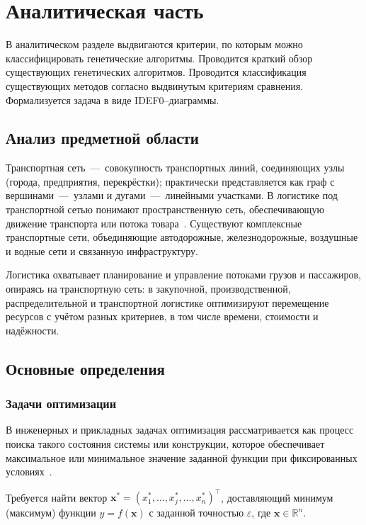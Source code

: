 \chapter{Аналитическая часть}

В аналитическом разделе выдвигаются критерии, по которым можно классифицировать генетические алгоритмы. Проводится краткий обзор существующих генетических алгоритмов. Проводится классификация существующих методов
согласно выдвинутым критериям сравнения. Формализуется задача
в виде IDEF0–диаграммы.

\section{Анализ предметной области}

Транспортная сеть~---~совокупность транспортных линий, соединяющих узлы (города, предприятия, перекрёстки); практически представляется как граф с вершинами~---~узлами и дугами~---~линейными участками. В логистике под транспортной сетью понимают пространственную сеть, обеспечивающую движение транспорта или потока товара~\cite{shaitura2017distributed}. Существуют комплексные транспортные сети, объединяющие автодорожные, железнодорожные, воздушные и водные сети и связанную инфраструктуру.

Логистика охватывает планирование и управление потоками грузов и пассажиров, опираясь на транспортную сеть: в закупочной, производственной, распределительной и транспортной логистике оптимизируют перемещение ресурсов с учётом разных критериев, в том числе времени, стоимости и надёжности. 

\section{Основные определения}

\subsection{Задачи оптимизации}

В инженерных и прикладных задачах оптимизация рассматривается как процесс поиска такого состояния системы или конструкции, которое обеспечивает максимальное или минимальное значение заданной функции при фиксированных условиях~\cite{vereshchaga2023design}. 

Требуется найти вектор $\mathbf{x}^* = (x_1^*,\dots,x_j^*,\dots,x_n^*)^\intercal$, 
доставляющий минимум (максимум) функции $y = f(\mathbf{x})$ с заданной 
точностью $\varepsilon$, где $\mathbf{x} \in \mathbb{R}^n$.


